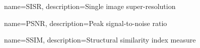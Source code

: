 {
    name=SISR,
    description={Single image super-resolution}
}

{
    name=PSNR,
    description={Peak signal-to-noise ratio}
}

{
    name=SSIM,
    description={Structural similarity index measure}
}
